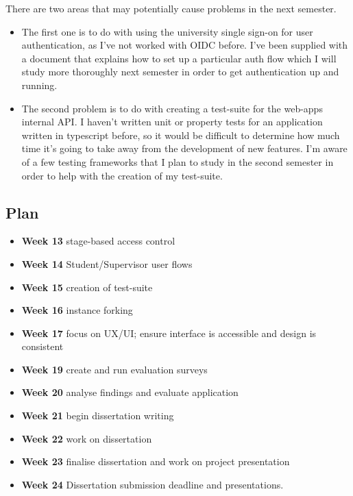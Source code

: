 \documentclass[11pt]{article}
\begin{document}
There are two areas that may potentially cause problems in the next semester.
\begin{itemize}
    \item The first one is to do with using the university single sign-on for user authentication, as I've not worked with OIDC before. I've been supplied with a document that explains how to set up a particular auth flow which I will study more thoroughly next semester in order to get authentication up and running.
    \item The second problem is to do with creating a test-suite for the web-apps internal API. I haven't written unit or property tests for an application written in typescript before, so it would be difficult to determine how much time it's going to take away from the development of new features. I'm aware of a few testing frameworks that I plan to study in the second semester in order to help with the creation of my test-suite.
\end{itemize}


\subsection{Plan}\label{plan}

\begin{itemize}
    \item \textbf{Week 13} stage-based access control
    \item \textbf{Week 14} Student/Supervisor user flows
    \item \textbf{Week 15} creation of test-suite
    \item \textbf{Week 16} instance forking
    \item \textbf{Week 17} focus on UX/UI; ensure interface is accessible and design is consistent
    \item \textbf{Week 19} create and run evaluation surveys
    \item \textbf{Week 20} analyse findings and evaluate application
    \item \textbf{Week 21} begin dissertation writing
    \item \textbf{Week 22} work on dissertation
    \item \textbf{Week 23} finalise dissertation and work on project presentation
    \item \textbf{Week 24} Dissertation submission deadline and presentations.
\end{itemize}
    
    
\end{document}
